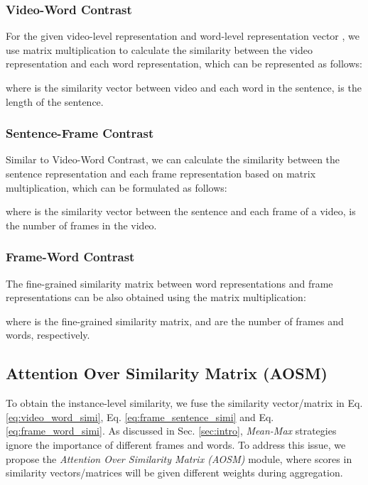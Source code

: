 \documentclass[sigconf]{acmart}
\begin{document}
\subsubsection{Video-Word Contrast} \label{sec:video_word}

For the given video-level representation  and word-level representation vector , we use matrix multiplication to calculate the similarity between the video representation and each word representation, which can be represented as follows:

where  is the similarity vector between video and each word in the sentence,  is the length of the sentence.

\subsubsection{Sentence-Frame Contrast} \label{sec:frame_sentence}

Similar to Video-Word Contrast, we can calculate the similarity between the sentence representation  and each frame representation  based on matrix multiplication, which can be formulated as follows:

where  is the similarity vector between the sentence and each frame of a video,  is the number of frames in the video.

\subsubsection{Frame-Word Contrast} \label{sec:frame_word}

The fine-grained similarity matrix between word representations and frame representations can be also obtained using the matrix multiplication:

where  is the fine-grained similarity matrix,  and  are the number of frames and words, respectively.


\subsection{Attention Over Similarity Matrix (AOSM)} \label{sec:attention}

To obtain the instance-level similarity, we fuse the similarity vector/matrix in Eq. \ref{eq:video_word_simi}, Eq. \ref{eq:frame_sentence_simi} and Eq. \ref{eq:frame_word_simi}. 
As discussed in Sec. \ref{sec:intro}, \emph{Mean-Max} strategies \cite{yao2021filip,khattab2020colbert,santhanam2021colbertv2,khattab2021relevance} ignore the importance of different frames and words. To address this issue, we propose the \emph{Attention Over Similarity Matrix (AOSM)} module, where scores in similarity vectors/matrices will be given different weights during aggregation.
\end{document}
